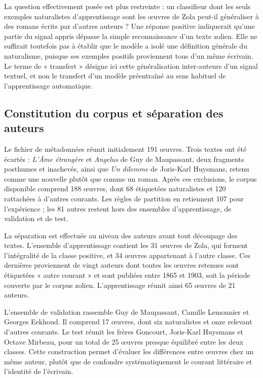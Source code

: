 La question effectivement posée est plus restreinte : un classifieur dont les seuls exemples naturalistes d'apprentissage sont les œuvres de Zola peut-il généraliser à des romans écrits par d'autres auteurs ? Une réponse positive indiquerait qu'une partie du signal appris dépasse la simple reconnaissance d'un texte zolien. Elle ne suffirait toutefois pas à établir que le modèle a isolé une définition générale du naturalisme, puisque ses exemples positifs proviennent tous d'un même écrivain. Le terme de « transfert » désigne ici cette généralisation inter-auteurs d'un signal textuel, et non le transfert d'un modèle préentraîné au sens habituel de l'apprentissage automatique.

\subsection{Constitution du corpus et séparation des auteurs}

Le fichier de métadonnées réunit initialement 191 œuvres. Trois textes ont été écartés : \textit{L'Âme étrangère} et \textit{Angelus} de Guy de Maupassant, deux fragments posthumes et inachevés, ainsi que \textit{Un dilemme} de Joris-Karl Huysmans, retenu comme une nouvelle plutôt que comme un roman. Après ces exclusions, le corpus disponible comprend 188 œuvres, dont 68 étiquetées naturalistes et 120 rattachées à d'autres courants. Les règles de partition en retiennent 107 pour l'expérience ; les 81 autres restent hors des ensembles d'apprentissage, de validation et de test.

La séparation est effectuée au niveau des auteurs avant tout découpage des textes. L'ensemble d'apprentissage contient les 31 œuvres de Zola, qui forment l'intégralité de la classe positive, et 34 œuvres appartenant à l'autre classe. Ces dernières proviennent de vingt auteurs dont toutes les œuvres retenues sont étiquetées « autre courant » et sont publiées entre 1865 et 1903, soit la période couverte par le corpus zolien. L'apprentissage réunit ainsi 65 œuvres de 21 auteurs.

L'ensemble de validation rassemble Guy de Maupassant, Camille Lemonnier et Georges Eekhoud. Il comprend 17 œuvres, dont six naturalistes et onze relevant d'autres courants. Le test réunit les frères Goncourt, Joris-Karl Huysmans et Octave Mirbeau, pour un total de 25 œuvres presque équilibré entre les deux classes. Cette construction permet d'évaluer les différences entre œuvres chez un même auteur, plutôt que de confondre systématiquement le courant littéraire et l'identité de l'écrivain.

